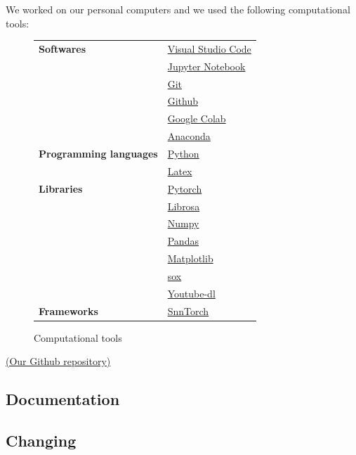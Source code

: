 \documentclass[11pt]{article}
\begin{document}
We worked on our personal computers and we used the following computational tools: 


\begin{figure}[h]
\begin{center}
  \begin{tabularx}{\textwidth}{|X|X|}
  \hline
  \textbf{Softwares} & \href{https://code.visualstudio.com/}{Visual Studio Code} \\
   & \href{https://jupyter.org/}{Jupyter Notebook} \\
   & \href{https://git-scm.com/}{Git} \\
   & \href{https://github.com/}{Github} \\
   & \href{https://colab.research.google.com/}{Google Colab} \\
    & \href{https://www.anaconda.com/products/individual}{Anaconda} \\
  \hline
  \textbf{Programming languages} 
   & \href{https://www.python.org/}{Python} \\
    & \href{https://www.latex-project.org/}{Latex} \\
  \hline
  \textbf{Libraries} & \href{https://pytorch.org/}{Pytorch} \\
   & \href{https://librosa.org/doc/latest/index.html}{Librosa} \\
   & \href{https://numpy.org/}{Numpy} \\
   & \href{https://pandas.pydata.org/}{Pandas} \\
   & \href{https://matplotlib.org/}{Matplotlib} \\
   & \href{https://pytorch.org/audio/stable/index.html}{sox} \\
   & \href{https://github.com/ytdl-org/youtube-dl}{Youtube-dl} \\
  \hline
  \textbf{Frameworks} & \href{https://github.com/eriksoper/SnnTorch}{SnnTorch} \\
  \hline
  \end{tabularx}
  \end{center}
  \caption{Computational tools}
\end{figure}

\href{https://github.com/LGPolytech/Project_S9}{(Our Github repository)}



\subsection{Documentation}

\subsection{Changing}
\end{document}
